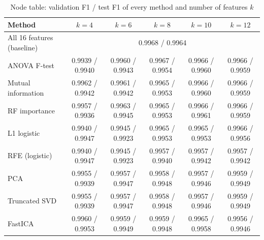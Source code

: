 \begin{appendices}
\begin{table}[htbp]\centering\caption{Node table: validation F1 / test F1 of every method and number of features $k$}\label{tab:fsnode}\scriptsize
\begin{tabular}{|l|c|c|c|c|c|}\hline
\textbf{Method} & \textbf{$k=4$} & \textbf{$k=6$} & \textbf{$k=8$} & \textbf{$k=10$} & \textbf{$k=12$} \\ \hline
All 16 features (baseline) & \multicolumn{5}{c|}{0.9968 / 0.9964} \\ \hline
ANOVA F-test & 0.9939 / 0.9940 & 0.9960 / 0.9943 & 0.9967 / 0.9954 & 0.9966 / 0.9960 & 0.9966 / 0.9959 \\ \hline
Mutual information & 0.9962 / 0.9942 & 0.9961 / 0.9942 & 0.9965 / 0.9953 & 0.9966 / 0.9960 & 0.9966 / 0.9959 \\ \hline
RF importance & 0.9957 / 0.9936 & 0.9963 / 0.9945 & 0.9965 / 0.9953 & 0.9966 / 0.9961 & 0.9966 / 0.9959 \\ \hline
L1 logistic & 0.9940 / 0.9947 & 0.9945 / 0.9923 & 0.9965 / 0.9953 & 0.9965 / 0.9953 & 0.9966 / 0.9956 \\ \hline
RFE (logistic) & 0.9940 / 0.9947 & 0.9945 / 0.9923 & 0.9957 / 0.9940 & 0.9957 / 0.9942 & 0.9957 / 0.9942 \\ \hline
PCA & 0.9955 / 0.9939 & 0.9957 / 0.9947 & 0.9958 / 0.9948 & 0.9957 / 0.9946 & 0.9959 / 0.9949 \\ \hline
Truncated SVD & 0.9955 / 0.9939 & 0.9957 / 0.9947 & 0.9958 / 0.9948 & 0.9957 / 0.9946 & 0.9959 / 0.9949 \\ \hline
FastICA & 0.9960 / 0.9953 & 0.9959 / 0.9949 & 0.9959 / 0.9948 & 0.9965 / 0.9958 & 0.9956 / 0.9946 \\ \hline
\end{tabular}\end{table}


\end{appendices}
